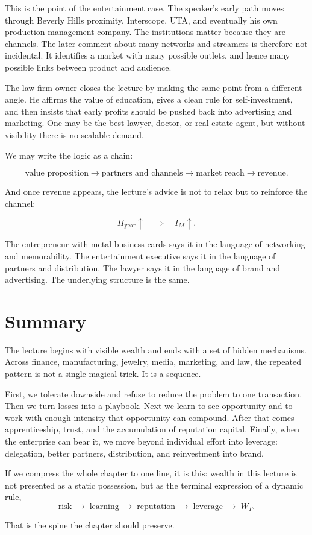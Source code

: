 This is the point of the entertainment case. The speaker's early path moves through Beverly Hills proximity, Interscope, UTA, and eventually his own production-management company. The institutions matter because they are channels. The later comment about many networks and streamers is therefore not incidental. It identifies a market with many possible outlets, and hence many possible links between product and audience.

The law-firm owner closes the lecture by making the same point from a different angle. He affirms the value of education, gives a clean rule for self-investment, and then insists that early profits should be pushed back into advertising and marketing. One may be the best lawyer, doctor, or real-estate agent, but without visibility there is no scalable demand.

We may write the logic as a chain:

\begin{equation}
\mbox{value proposition} \longrightarrow \mbox{partners and channels} \longrightarrow \mbox{market reach} \longrightarrow \mbox{revenue}.
\end{equation}

And once revenue appears, the lecture's advice is not to relax but to reinforce the channel:

\begin{equation}
\Pi_{\mathrm{year}} \uparrow \quad \Rightarrow \quad I_M \uparrow.
\end{equation}

The entrepreneur with metal business cards says it in the language of networking and memorability. The entertainment executive says it in the language of partners and distribution. The lawyer says it in the language of brand and advertising. The underlying structure is the same.

\section{Summary}

The lecture begins with visible wealth and ends with a set of hidden mechanisms. Across finance, manufacturing, jewelry, media, marketing, and law, the repeated pattern is not a single magical trick. It is a sequence.

First, we tolerate downside and refuse to reduce the problem to one transaction. Then we turn losses into a playbook. Next we learn to see opportunity and to work with enough intensity that opportunity can compound. After that comes apprenticeship, trust, and the accumulation of reputation capital. Finally, when the enterprise can bear it, we move beyond individual effort into leverage: delegation, better partners, distribution, and reinvestment into brand.

If we compress the whole chapter to one line, it is this: wealth in this lecture is not presented as a static possession, but as the terminal expression of a dynamic rule,
\begin{equation}
\mbox{risk} \;\rightarrow\; \mbox{learning} \;\rightarrow\; \mbox{reputation} \;\rightarrow\; \mbox{leverage} \;\rightarrow\; W_T.
\end{equation}

That is the spine the chapter should preserve.